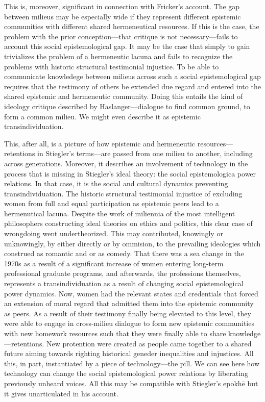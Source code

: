 \documentclass[letterpaper,notitlepage,12pt]{article}
\begin{document}
This is, moreover, significant in connection with Fricker's account.
The gap between milieus may be especially wide if they represent different
epistemic communities with different shared hermeneutical resources.
If this is the case, the problem with the prior conception---that critique is
not necessary---fails to account this social epistemological gap.
It may be the case that simply  to gain
 trivializes the problem of a hermeneutic lacuna and
fails to recognize the problems with historic structural testimonial injustice.
To be able to communicate knowledege between milieus across such a social
epistemological gap requires that the testimony of others be extended due regard
and entered into the shared epistemic and hermeneutic community.
Doing this entails the kind of ideology critique described by
Haslanger---dialogue to find common ground, to form a common milieu.
We might even describe it as epistemic transindividuation.

This, after all, is a picture of how epistemic and hermeneutic
resources---retentions in Stiegler's terms---are passed from one milieu to
another, including across generations.
Moreover, it describes an involvement of technology in the process that is
missing in Stiegler's ideal theory: the social epistemologica power relations.
In that case, it is the social and cultural dynamics preventing
transindividuation.
The historic structural testimonial injustice of excluding women from full and
equal participation as epistemic peers lead to a hermenutical lacuna.
Despite the work of miliennia of the most intelligent philosophers constructing
ideal theories on ethics and politics, this clear case of wrongdoing went
undertheorized.
This may contributed, knowingly or unknowingly, by either directly or by
ommision, to the prevailing ideologies which construed  as romantic and  or  as comedy.
That there was a sea change in the 1970s as a result of a significant increase
of women entering long-term professional graduate programs, and afterwards, the
professions themselves, represents a transindividuation as a result of changing
social epistemological power dynamics.
Now, women had the relevant states and credentials that forced an extension of
moral regard that admitted them into the epistemic community as peers.
As a result of their testimony finally being elevated to this level, they were
able to engage in cross-milieu dialogue to form new epistemic communities with
new homework resources such that they were finally able to share
knowledge---retentions.
New protention were created as people came together to a shared future aiming
towards righting historical geneder inequalities and injustices.
All this, in part, instantiated by a piece of technology---the pill.
We can see here how technology can change the social epistemological power
relations by liberating previously unheard voices.
All this may be compatible with Stiegler's epokh\={e} but it gives unarticulated
in his account.
\end{document}
